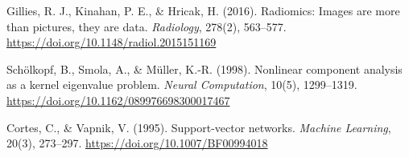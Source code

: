     Gillies, R. J., Kinahan, P. E., \& Hricak, H. (2016).
    Radiomics: Images are more than pictures, they are data.
    \textit{Radiology}, 278(2), 563--577.
    \url{https://doi.org/10.1148/radiol.2015151169}

    Sch{\"o}lkopf, B., Smola, A., \& M{\"u}ller, K.-R. (1998).
    Nonlinear component analysis as a kernel eigenvalue problem.
    \textit{Neural Computation}, 10(5), 1299--1319.
    \url{https://doi.org/10.1162/089976698300017467}

    Cortes, C., \& Vapnik, V. (1995).
    Support-vector networks.
    \textit{Machine Learning}, 20(3), 273--297.
    \url{https://doi.org/10.1007/BF00994018}
